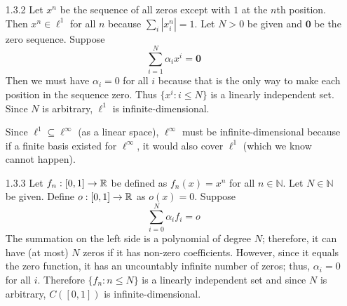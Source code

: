 \documentclass[../../Solutions.tex]{subfiles}
\begin{document}
\begin{itemize}
	\item [1.3.2] Let $x^n$ be the sequence of all zeros except with $1$ at the $n$th position.
	Then $x^n \in \ell^1$ for all $n$ because $\sum_i |x^n_i| = 1$.
	Let $N > 0$ be given and $\mathbf{0}$ be the zero sequence.
	Suppose
	$$ \sum_{i = 1}^N \alpha_i x^i = \mathbf{0} $$
	Then we must have $\alpha_i = 0$ for all $i$ because that is the only way to make each position in the sequence zero.
	Thus $\{x^i : i \leq N \}$ is a linearly independent set.
	Since $N$ is arbitrary, $\ell^1$ is infinite-dimensional.
	
	Since $\ell^1 \subseteq \ell^\infty$ (as a linear space), $\ell^\infty$ must be infinite-dimensional because if a finite basis existed for $\ell^\infty$, it would also cover $\ell^1$ (which we know cannot happen).
	
	\item [1.3.3] Let $f_n:[0,1] \to \mathbb{R}$ be defined as $f_n(x) = x^n$ for all $n \in \mathbb{N}$.
	Let $N \in \mathbb{N}$ be given.
	Define $o:[0,1] \to \mathbb{R}$ as $o(x) = 0$.
	Suppose
	$$ \sum_{i=0}^N \alpha_i f_i = o $$
	The summation on the left side is a polynomial of degree $N$; therefore, it can have (at most) $N$ zeros if it has non-zero coefficients.
	However, since it equals the zero function, it has an uncountably infinite number of zeros; thus, $\alpha_i = 0$ for all $i$.
	Therefore $\{f_n : n \leq N \}$ is a linearly independent set and since $N$ is arbitrary, $C([0,1])$ is infinite-dimensional.
	
\end{itemize}
\end{document}
